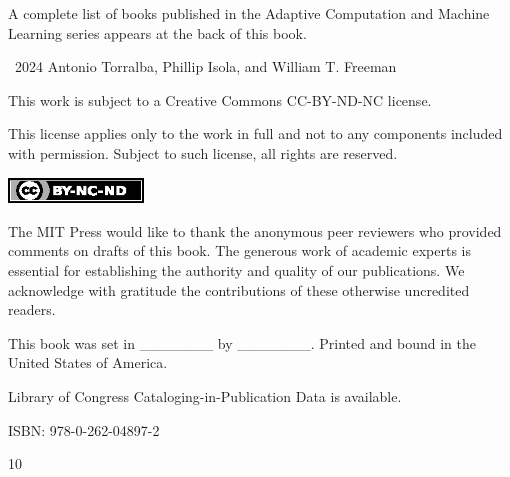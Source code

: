 \frontmatter

\halftitlepage

\begin{seriespage}

A complete list of books published in the Adaptive Computation and Machine Learning series appears at the back of this book.
\end{seriespage}


\cleardoublepage





\begin{copyrightpage}
\textcopyright\ 2024 Antonio Torralba, Phillip Isola, and William T. Freeman

This work is subject to a Creative Commons CC-BY-ND-NC license.

This license applies only to the work in full and not to any components included with permission. Subject to such license, all rights are reserved.

\includegraphics[width=0.27\textwidth]{figures/by-nc-nd.eps}

The MIT Press would like to thank the anonymous peer reviewers who provided comments on drafts of this book. The generous work of academic experts is essential for establishing the authority and quality of our publications. We acknowledge with gratitude the contributions of these otherwise uncredited readers.

This book was set in \_\_\_\_\_\_\_ by \_\_\_\_\_\_\_. Printed and bound in the United States of America.

Library of Congress Cataloging-in-Publication Data is available.

ISBN: 978-0-262-04897-2

10
\end{copyrightpage}

